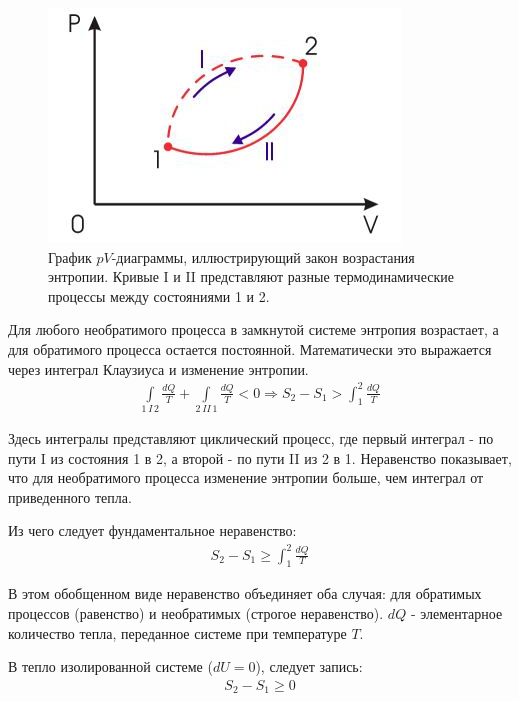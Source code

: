 \begin{figure}[H]
	\centering
	\includegraphics[width=0.7\linewidth]{image/Rule}
	\caption{График $pV$-диаграммы, иллюстрирующий закон возрастания энтропии.
		Кривые I и II представляют разные термодинамические процессы между состояниями 1 и 2.}
	\label{fig:8}
\end{figure}

Для любого необратимого процесса в замкнутой системе энтропия возрастает,
а для обратимого процесса остается постоянной. Математически это выражается
через интеграл Клаузиуса и изменение энтропии.
\begin{align} \label{35.6}
	\int\limits_{1\,I\,2} \frac{dQ}{T} + \int\limits_{2\,II\,1} \frac{dQ}{T} < 0
	\Rightarrow
	S_2 - S_1 > \int_{1}^{2} \frac{dQ}{T}
\end{align}

Здесь интегралы представляют циклический процесс, где первый интеграл - по пути I из состояния 1 в 2, а второй - по пути II из 2 в 1. Неравенство показывает, что для необратимого процесса изменение энтропии больше, чем интеграл от приведенного тепла.

Из чего следует фундаментальное неравенство:
\begin{align} \label{35.7}
	\boxed{S_2 - S_1 \geqslant \int_{1}^{2} \frac{dQ}{T}}
\end{align}

В этом обобщенном виде неравенство объединяет оба случая: для обратимых процессов (равенство) и необратимых (строгое неравенство). $dQ$ - элементарное количество тепла, переданное системе при температуре $T$.

В тепло изолированной системе ($dU = 0$), следует запись:
\begin{align} \label{35.8}
	\boxed{S_2 - S_1 \geqslant 0}
\end{align}

